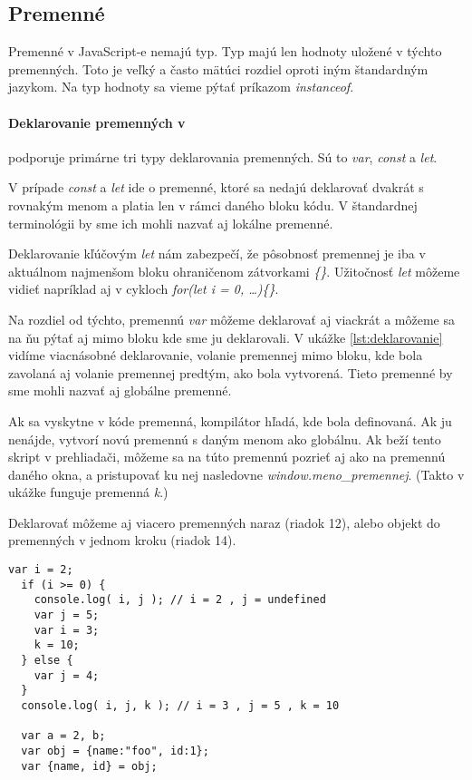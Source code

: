 \subsection{Premenné}
Premenné v JavaScript-e nemajú typ.  Typ majú len hodnoty uložené v týchto premenných. Toto je veľký a často mätúci rozdiel oproti iným štandardným jazykom. Na typ hodnoty sa vieme pýtať príkazom \emph{instanceof}.

\paragraph{Deklarovanie premenných v \JS{}}
\JS{} podporuje primárne tri typy deklarovania premenných. Sú to \emph{var}, \emph{const} a \emph{let}. 

V prípade \emph{const} a \emph{let} ide o premenné, ktoré sa nedajú deklarovať dvakrát s rovnakým menom a platia len v rámci daného bloku kódu. V štandardnej terminológii by sme ich mohli nazvať aj lokálne premenné. 

Deklarovanie kľúčovým \emph{let} nám zabezpečí, že pôsobnosť premennej je iba v aktuálnom najmenšom bloku ohraničenom zátvorkami \emph{\{\}}. Užitočnosť \emph{let} môžeme vidieť napríklad aj v cykloch \emph{for(let i = 0, \ldots)\{\}}.

Na rozdiel od týchto, premennú \emph{var} môžeme deklarovať aj viackrát a môžeme sa na ňu pýtať aj mimo bloku kde sme ju deklarovali. V ukážke \ref{lst:deklarovanie} vidíme viacnásobné deklarovanie, volanie premennej mimo bloku, kde bola zavolaná aj volanie premennej predtým, ako bola vytvorená. Tieto premenné by sme mohli nazvať aj globálne premenné. 

Ak sa vyskytne v kóde premenná, kompilátor hľadá, kde bola definovaná. Ak ju nenájde, vytvorí novú premennú s daným menom ako globálnu. Ak beží tento skript v prehliadači, môžeme sa na túto premennú pozrieť aj ako na premennú daného okna, a pristupovať ku nej nasledovne \emph{window.meno\_premennej}. (Takto v ukážke funguje premenná \emph{k}.)

Deklarovať môžeme aj viacero premenných naraz (riadok 12), alebo  objekt do premenných v jednom kroku (riadok 14).

\begin{lstlisting}[caption=JavaScript deklarovanie, label={lst:deklarovanie}]
  var i = 2;
  if (i >= 0) {
    console.log( i, j ); // i = 2 , j = undefined
    var j = 5;
    var i = 3;
    k = 10;
  } else {
    var j = 4;
  }
  console.log( i, j, k ); // i = 3 , j = 5 , k = 10

  var a = 2, b;
  var obj = {name:"foo", id:1};
  var {name, id} = obj;
\end{lstlisting}

